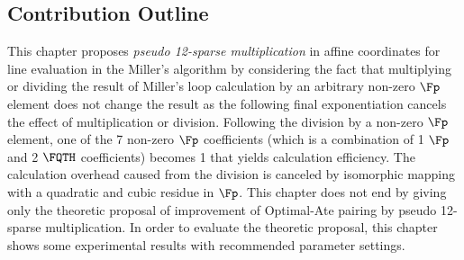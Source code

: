 \subsection{Contribution Outline}
 This chapter proposes \textit{pseudo 12-sparse multiplication} in affine coordinates for line evaluation in the Miller's algorithm by considering the fact that multiplying or dividing the result of Miller's loop calculation by an arbitrary non-zero $\Fp$ element does not change the result as the following final exponentiation cancels the effect of multiplication or division. 
Following the division by a non-zero $\Fp$ element, one of the 7 non-zero $\Fp$ coefficients (which is a combination of 1 $\Fp$ and 2 $\FQTH$ coefficients) becomes 1 that yields calculation efficiency.
The calculation overhead caused from the division is canceled by isomorphic mapping with a quadratic and cubic residue in $\Fp$.
This chapter does not end by giving only the theoretic proposal of improvement of Optimal-Ate pairing by pseudo 12-sparse multiplication.
In order to evaluate the theoretic proposal, this chapter shows some experimental results with recommended parameter settings. 

